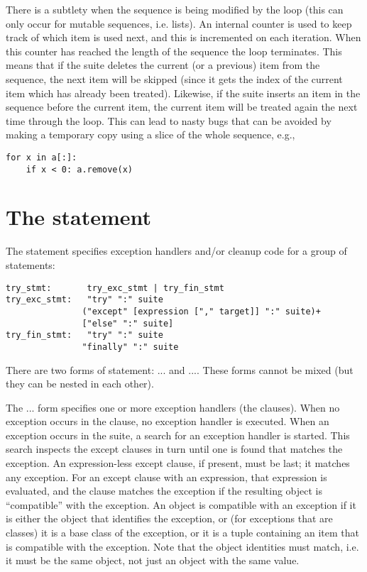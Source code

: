  There is a subtlety when the sequence is being modified
by the loop (this can only occur for mutable sequences, i.e. lists).
An internal counter is used to keep track of which item is used next,
and this is incremented on each iteration.  When this counter has
reached the length of the sequence the loop terminates.  This means that
if the suite deletes the current (or a previous) item from the
sequence, the next item will be skipped (since it gets the index of
the current item which has already been treated).  Likewise, if the
suite inserts an item in the sequence before the current item, the
current item will be treated again the next time through the loop.
This can lead to nasty bugs that can be avoided by making a temporary
copy using a slice of the whole sequence, e.g.,

\begin{verbatim}
for x in a[:]:
    if x < 0: a.remove(x)
\end{verbatim}

\section{The  statement} \label{try}

The  statement specifies exception handlers and/or cleanup
code for a group of statements:

\begin{verbatim}
try_stmt:       try_exc_stmt | try_fin_stmt
try_exc_stmt:   "try" ":" suite
               ("except" [expression ["," target]] ":" suite)+
               ["else" ":" suite]
try_fin_stmt:   "try" ":" suite
               "finally" ":" suite
\end{verbatim}

There are two forms of  statement:
... and
....  These forms cannot be mixed (but
they can be nested in each other).

The ... form specifies one or more
exception handlers
(the  clauses).  When no exception occurs in the
 clause, no exception handler is executed.  When an
exception occurs in the  suite, a search for an exception
handler is started.  This search inspects the except clauses in turn until
one is found that matches the exception.  An expression-less except
clause, if present, must be last; it matches any exception.  For an
except clause with an expression, that expression is evaluated, and the
clause matches the exception if the resulting object is ``compatible''
with the exception.  An object is compatible with an exception if it
is either the object that identifies the exception, or (for exceptions
that are classes) it is a base class of the exception, or it is a
tuple containing an item that is compatible with the exception.  Note
that the object identities must match, i.e. it must be the same
object, not just an object with the same value.

